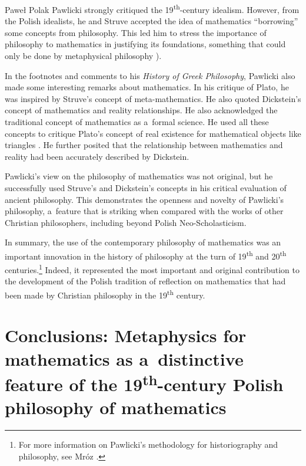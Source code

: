 \begin{artengenv}{Paweł Polak}
Pawlicki strongly critiqued the 19\textsuperscript{th}-century idealism. However, from the Polish idealists, he and Struve accepted the idea of mathematics ``borrowing'' some concepts from philosophy. This led him to stress the importance of philosophy to mathematics in justifying its foundations, something that could only be done by metaphysical philosophy
\parencite[][p.459 (footnote 2]{pawlicki_historya_1903}%
).

In the footnotes and comments to his \textit{History of Greek Philosophy}, Pawlicki also made some interesting remarks about mathematics. In his critique of Plato, he was inspired by Struve's concept of meta-mathematics. He also quoted Dickstein's concept of mathematics and reality relationships. He also acknowledged the traditional concept of mathematics as a~formal science. He used all these concepts to critique Plato's concept of real existence for mathematical objects like triangles
\parencite[][pp.469–470]{pawlicki_historya_1903}. %
 He further posited that the relationship between mathematics and reality had been accurately described by Dickstein.

Pawlicki's view on the philosophy of mathematics was not original, but he successfully used Struve's and Dickstein's concepts in his critical evaluation of ancient philosophy. This demonstrates the openness and novelty of Pawlicki's philosophy, a~feature that is striking when compared with the works of other Christian philosophers, including beyond Polish Neo-Scholasticism.

In summary, the use of the contemporary philosophy of mathematics was an important innovation in the history of philosophy at the turn of 19\textsuperscript{th} and 20\textsuperscript{th} centuries.\footnote{For more information on Pawlicki's methodology for historiography and philosophy, see Mróz
\parencite*[][]{mroz_metoda_2008}.%
} Indeed, it represented the most important and original contribution to the development of the Polish tradition of reflection on mathematics that had been made by Christian philosophy in the 19\textsuperscript{th} century.

\section*{Conclusions: Metaphysics for mathematics as a~distinctive feature of the 19\textsuperscript{th}-century Polish philosophy of mathematics}


\end{artengenv}
